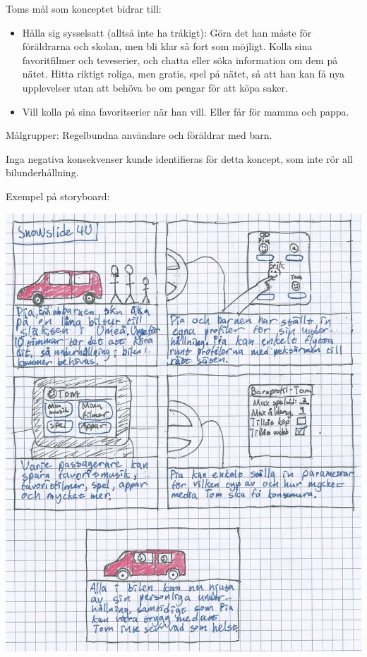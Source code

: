 \documentclass[a4paper,12pt,titlepage]{article}
\begin{document}
Toms mål som konceptet bidrar till:
\begin{itemize}
    \item Hålla sig sysselsatt (alltså inte ha
        tråkigt): Göra det han måste för
        föräldrarna och skolan, men bli klar så
        fort som möjligt. Kolla sina
        favoritfilmer och teveserier, och chatta
        eller söka information om dem på
        nätet. Hitta riktigt roliga, men gratis,
        spel på nätet, så att han kan få nya
        upplevelser utan att behöva be om
        pengar för att köpa saker. 
    \item Vill kolla på sina favoritserier när
        han vill. Eller får för mamma och
        pappa.
\end{itemize}

Målgrupper: Regelbundna användare och föräldrar med barn.

Inga negativa konsekvenser kunde identifieras för detta koncept, som inte rör
all bilunderhållning.

Exempel på storyboard:

\begin{center}
\includegraphics[width=14cm]{images/4u.jpg}
\end{center}
\end{document}
